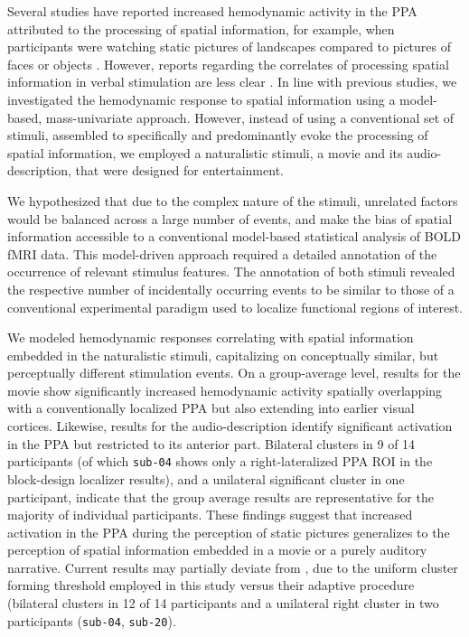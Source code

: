 \documentclass[english]{article}
\begin{document}
Several studies have reported increased hemodynamic activity in the PPA
attributed to the processing of spatial information, for example, when
participants were watching static pictures of landscapes compared to pictures of
faces or objects \citep[e.g.,][]{epstein1998ppa, epstein1999parahippocampal}.
However, reports regarding the correlates of processing spatial information in
verbal stimulation are less clear \citep{aziz2008modulation}.
In line with previous studies, we investigated the hemodynamic response to
spatial information using a model-based, mass-univariate approach.
However, instead of using a conventional set of stimuli, assembled to
specifically and predominantly evoke the processing of spatial information, we
employed a naturalistic stimuli, a movie and its audio-description, that were
designed for entertainment.

We hypothesized that due to the complex nature of the stimuli, unrelated factors
would be balanced across a large number of events, and make the bias of spatial
information accessible to a conventional model-based statistical analysis of BOLD
fMRI data.
This model-driven approach required a detailed annotation of the occurrence of
relevant stimulus features.
The annotation of both stimuli revealed the respective number of incidentally
occurring events to be similar to those of a conventional experimental paradigm
used to localize functional regions of interest.

We modeled hemodynamic responses correlating with spatial information embedded
in the naturalistic stimuli, capitalizing on conceptually similar, but
perceptually different stimulation events.
On a group-average level, results for the movie show significantly
increased hemodynamic activity spatially overlapping with a conventionally
localized PPA but also extending into earlier visual cortices.
Likewise, results for the audio-description identify significant activation in
the PPA but restricted to its anterior part.
Bilateral clusters in 9 of 14
participants (of which \texttt{sub-04} shows only a right-lateralized PPA ROI
in the block-design localizer results), and a unilateral
significant cluster in one participant, indicate that the group average results
are representative for the majority of individual participants.
These findings suggest that increased activation in the PPA during the
perception of static pictures generalizes to the perception of spatial
information embedded in a movie or a purely auditory narrative.
%
Current results may partially deviate from \cite{sengupta2016extension}, due to
the uniform cluster forming threshold employed in this study versus their
adaptive procedure (bilateral clusters in 12 of 14 participants and a unilateral
right cluster in two participants (\texttt{sub-04}, \texttt{sub-20}).
\end{document}
